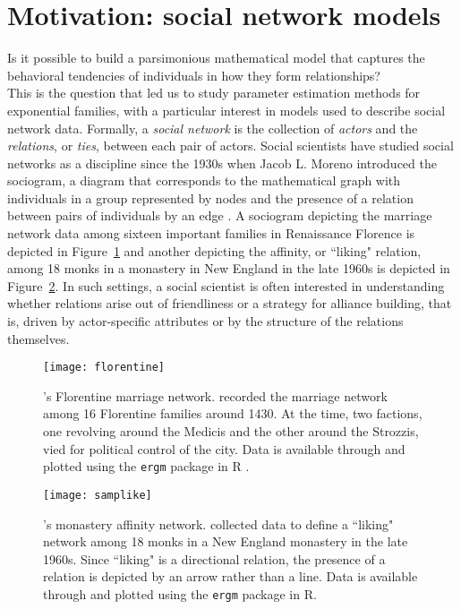 \section{Motivation: social network models}
Is it possible to build a parsimonious mathematical model that captures the 
behavioral tendencies of individuals in how they form relationships?\\  %

This is the question that led us to study parameter estimation methods for exponential 
families, with a particular interest in models used to describe social network data.  
Formally, a \emph{social network} is the collection of \emph{actors} and the 
\emph{relations}, or \emph{ties}, between each pair of actors.
Social scientists have studied social networks as a discipline since the 
1930s when Jacob L. Moreno introduced the sociogram, a diagram that corresponds to
the mathematical graph with individuals in a group 
represented by nodes and the presence of a relation between 
pairs of individuals by an edge \citep[Chapter 3]{Wasserman:1994}.  
A sociogram depicting the marriage network data among sixteen 
important families in Renaissance Florence \citep{Padgett} is depicted in 
Figure~\ref{F:Florentine} and another depicting the affinity, or ``liking" relation, among 18 
monks in a monastery in New England in the late 1960s \citep{Sampson} is depicted in 
Figure~\ref{F:Sampson}.  In such settings, a social scientist is often interested in 
understanding whether relations arise out of friendliness or a strategy for alliance 
building, that is, driven by actor-specific attributes or by the structure of  the relations themselves.
\begin{figure}[h!]
\begin{center}
\texttt{[image: florentine]} %
\end{center}
\caption[\citeauthor{Padgett}'s \citeyearpar{Padgett} Florentine marriage network]{
\citeauthor{Padgett}'s \citeyearpar{Padgett} Florentine marriage network.  \citeauthor{Padgett} recorded the marriage network among 16 Florentine families around 1430.  At the time, two factions, one revolving around the 
Medicis and the other around the Strozzis, vied for political control of the city.   
Data is available through and plotted using the \texttt{ergm} package \citep*{ergm:R} in 
R \citep*{R}.}
\label{F:Florentine}
\end{figure}

\begin{figure}[h!]
\begin{center}
\texttt{[image: samplike]} %
\end{center}
\caption[\citeauthor{Sampson}'s \citeyearpar{Sampson} monastery affinity network]
{\citeauthor{Sampson}'s \citeyearpar{Sampson} monastery affinity network.  \citeauthor{Sampson} collected data to define a ``liking" network among 18 monks 
in a New England monastery in the late 1960s.  Since ``liking" is a directional 
relation, the presence of a relation is depicted by an arrow rather than a line.  Data 
is available through and plotted using the \texttt{ergm} package \citep{ergm:R} in R.}
\label{F:Sampson}
\end{figure}

